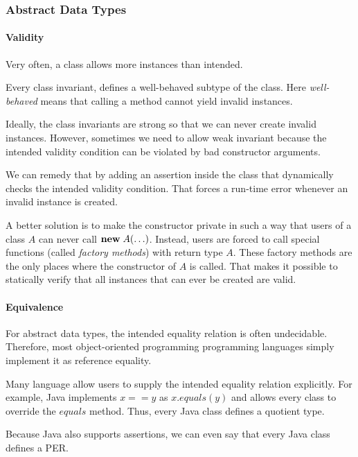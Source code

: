 \subsubsection{Abstract Data Types}

\paragraph{Validity}
Very often, a class allows more instances than intended.

Every class invariant, defines a well-behaved subtype of the class.
Here \emph{well-behaved} means that calling a method cannot yield invalid instances.

Ideally, the class invariants are strong so that we can never create invalid instances.
However, sometimes we need to allow weak invariant because the intended validity condition can be violated by bad constructor arguments.

We can remedy that by adding an assertion inside the class that dynamically checks the intended validity condition.
That forces a run-time error whenever an invalid instance is created.

A better solution is to make the constructor private in such a way that users of a class $A$ can never call ${\rm \bf new}\; A(\ldots)$.
Instead, users are forced to call special functions (called \emph{factory methods}) with return type $A$.
These factory methods are the only places where the constructor of $A$ is called.
That makes it possible to statically verify that all instances that can ever be created are valid.

\paragraph{Equivalence}
For abstract data types, the intended equality relation is often undecidable.
Therefore, most object-oriented programming programming languages simply implement it as reference equality.

Many language allow users to supply the intended equality relation explicitly.
For example, Java implements $x==y$ as $x.equals(y)$ and allows every class to override the $equals$ method.
Thus, every Java class defines a quotient type.

Because Java also supports assertions, we can even say that every Java class defines a PER.